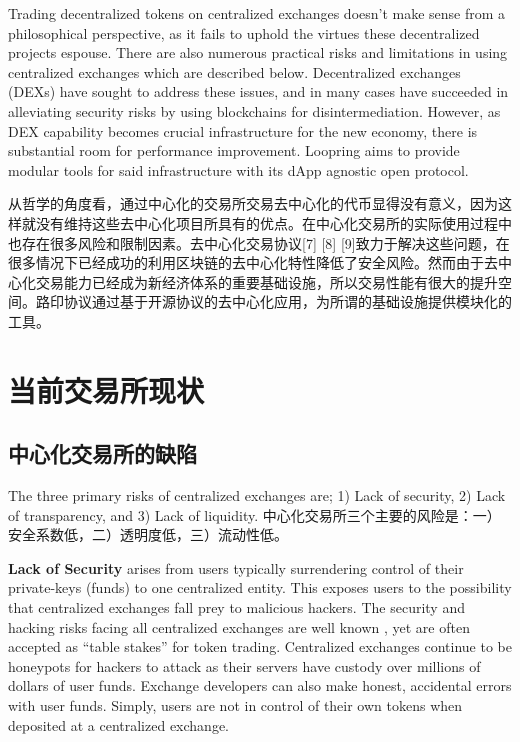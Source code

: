 \documentclass[UTF8,nofonts]{ctexart}
\begin{document}
\begin{multicols}{2}
Trading decentralized tokens on centralized exchanges doesn't make sense from a philosophical perspective, as it fails to uphold the virtues these decentralized projects espouse. There are also numerous practical risks and limitations in using centralized exchanges which are described below. Decentralized exchanges (DEXs) \cite{schuh2015bitshares} \cite{bancor} \cite{kyber} have sought to address these issues, and in many cases have succeeded in alleviating security risks by using blockchains for disintermediation. However, as DEX capability becomes crucial infrastructure for the new economy, there is substantial room for performance improvement. Loopring aims to provide modular tools for said infrastructure with its dApp agnostic open protocol.



从哲学的角度看，通过中心化的交易所交易去中心化的代币显得没有意义，因为这样就没有维持这些去中心化项目所具有的优点。在中心化交易所的实际使用过程中也存在很多风险和限制因素。去中心化交易协议[7] [8] [9]致力于解决这些问题，在很多情况下已经成功的利用区块链的去中心化特性降低了安全风险。然而由于去中心化交易能力已经成为新经济体系的重要基础设施，所以交易性能有很大的提升空间。路印协议通过基于开源协议的去中心化应用，为所谓的基础设施提供模块化的工具。


\section{当前交易所现状\label{sec:current_exchange_landscape}}

\subsection{中心化交易所的缺陷}
The three primary risks of centralized exchanges are; 1) Lack of security, 2) Lack of transparency, and 3) Lack of liquidity.
中心化交易所三个主要的风险是：一）安全系数低，二）透明度低，三）流动性低。


\textbf{Lack of Security} arises from users typically surrendering control of their private-keys (funds) to one centralized entity. This exposes users to the possibility that centralized exchanges fall prey to malicious hackers. The security and hacking risks facing all centralized exchanges are well known \cite{coincheckhack}  \cite{mcmillan2014inside}, yet are often accepted as \enquote{table stakes} for token trading. Centralized exchanges continue to be honeypots for hackers to attack as their servers have custody over millions of dollars of user funds. Exchange developers can also make honest, accidental errors with user funds. Simply, users are not in control of their own tokens when deposited at a centralized exchange.


\end{multicols}
\end{document}
